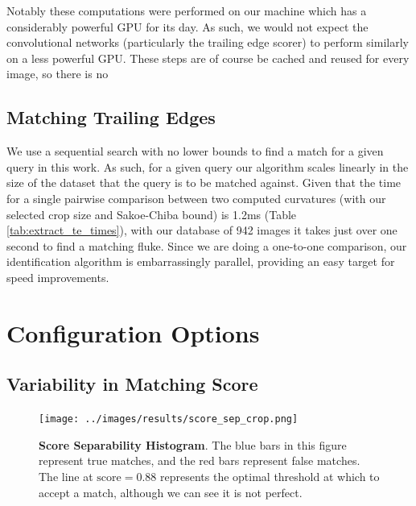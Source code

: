 Notably these computations were performed on our machine which has a considerably powerful GPU for its day.
As such, we would not expect the convolutional networks (particularly the trailing edge scorer) to perform similarly on a less powerful GPU.
These steps are of course be cached and reused for every image, so there is no 


\subsection{Matching Trailing Edges}

We use a sequential search with no lower bounds to find a match for a given query in this work.
As such, for a given query our algorithm scales linearly in the size of the dataset that the query is to be matched against.
Given that the time for a single pairwise comparison between two computed curvatures (with our selected crop size and Sakoe-Chiba bound) is 1.2ms (Table \ref{tab:extract_te_times}), with our database of 942 images it takes just over one second to find a matching fluke.
Since we are doing a one-to-one comparison, our identification algorithm is embarrassingly parallel, providing an easy target for speed improvements.

\section{Configuration Options}

\subsection{Variability in Matching Score}

\begin{figure}[t]%
\centering
\texttt{[image: ../images/results/score\_sep\_crop.png]}
\caption{\textbf{Score Separability Histogram}. The blue bars in this figure represent true matches, and the red bars represent false matches. The line at $\text{score} = 0.88$ represents the optimal threshold at which to accept a match, although we can see it is not perfect.}
\label{fig:score_sep}
\end{figure}

